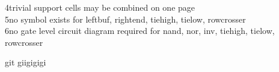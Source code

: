 \documentclass[11pt,a4paper]{article} %
\begin{document}
4trivial support cells may be combined on one page\\
5no symbol exists for leftbuf, rightend, tiehigh, tielow, rowcrosser\\
6no gate level circuit diagram required for nand, nor, inv, tiehigh, tielow, rowcrosser\\


 \newpage 



 \newpage 


\newpage 


 \newpage 


 \newpage 


 \newpage 

git giigigigi
 \newpage 


 \newpage 


 \newpage 
\end{document}
